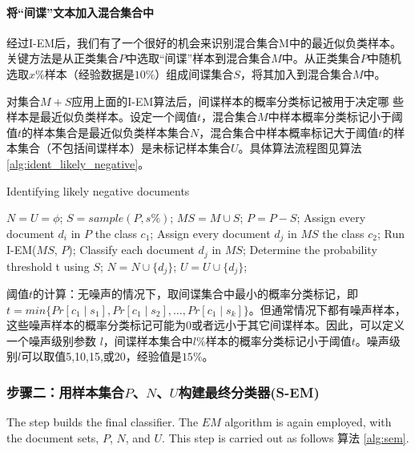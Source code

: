 \paragraph{将“间谍”文本加入混合集合中}

经过I-EM后，我们有了一个很好的机会来识别混合集合M中的最近似负类样本。关键方法是从正类集合$P$中选取“间谍”样本到混合集合$M$中。从正类集合$P$中随机选取$x\%$样本（经验数据是$10\%$）组成间谍集合$S$，将其加入到混合集合$M$中。

对集合$M + S$应用上面的I-EM算法后，间谍样本的概率分类标记被用于决定哪 些样本是最近似负类样本。设定一个阈值$t$，混合集合$M$中样本概率分类标记小于阈值$t$的样本集合是最近似负类样本集合$N$，混合集合中样本概率标记大于阈值$t$的样本集合（不包括间谍样本）是未标记样本集合$U$。具体算法流程图见算法 \ref{alg:ident_likely_negative}。


\begin{algorithm}[htb]
\caption{Identifying likely negative documents}
\label{alg:ident_likely_negative}
\begin{algorithmic}[1]
\STATE $N = U = \phi$;
\STATE $S = sample(P, s\%)$;
\STATE $MS = M \cup S$;
\STATE $P = P - S$;
\STATE Assign every document $d_i$ in $P$ the class $c_1$;
\STATE Assign every document $d_j$ in $MS$ the class $c_2$;
\STATE Run I-EM($MS$, $P$);
\STATE Classify each document $d_j$ in $MS$;
\STATE Determine the probability threshold t using $S$;
\IF {its probability $Pr{c_1 \mid d_j] < t}$ }
\STATE $N = N \cup \{d_j\}$;
\ELSE
\STATE $U = U \cup \{d_j\}$;
\ENDIF
\ENDFOR
\RETURN 
\end{algorithmic}
\end{algorithm}

阈值$t$的计算：无噪声的情况下，取间谍集合中最小的概率分类标记，即$t = min\{Pr[c_1 \mid s_1],Pr[c_1 \mid s_2],\ldots,Pr[c_1 \mid s_k]\}$。但通常情况下都有噪声样本，这些噪声样本的概率分类标记可能为0或者远小于其它间谍样本。因此，可以定义一个噪声级别参数 $l$，间谍样本集合中$l\%$样本的概率分类标记小于阈值$t$。噪声级别$l$可以取值5,10,15,或20，经验值是$15\%$。


\subsubsection{步骤二：用样本集合$P$、$N$、$U$构建最终分类器(S-EM)}

The step builds the final classifier. The $EM$ algorithm is again employed, with the document sets, $P$, $N$, and $U$. This step is carried out as follows 算法 \ref{alg:sem}.

